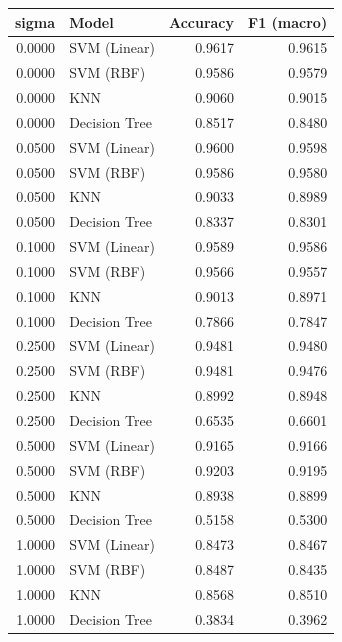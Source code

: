 \begin{tabular}{rlrr}
\toprule
sigma & Model & Accuracy & F1 (macro) \\
\midrule
0.0000 & SVM (Linear) & 0.9617 & 0.9615 \\
0.0000 & SVM (RBF) & 0.9586 & 0.9579 \\
0.0000 & KNN & 0.9060 & 0.9015 \\
0.0000 & Decision Tree & 0.8517 & 0.8480 \\
0.0500 & SVM (Linear) & 0.9600 & 0.9598 \\
0.0500 & SVM (RBF) & 0.9586 & 0.9580 \\
0.0500 & KNN & 0.9033 & 0.8989 \\
0.0500 & Decision Tree & 0.8337 & 0.8301 \\
0.1000 & SVM (Linear) & 0.9589 & 0.9586 \\
0.1000 & SVM (RBF) & 0.9566 & 0.9557 \\
0.1000 & KNN & 0.9013 & 0.8971 \\
0.1000 & Decision Tree & 0.7866 & 0.7847 \\
0.2500 & SVM (Linear) & 0.9481 & 0.9480 \\
0.2500 & SVM (RBF) & 0.9481 & 0.9476 \\
0.2500 & KNN & 0.8992 & 0.8948 \\
0.2500 & Decision Tree & 0.6535 & 0.6601 \\
0.5000 & SVM (Linear) & 0.9165 & 0.9166 \\
0.5000 & SVM (RBF) & 0.9203 & 0.9195 \\
0.5000 & KNN & 0.8938 & 0.8899 \\
0.5000 & Decision Tree & 0.5158 & 0.5300 \\
1.0000 & SVM (Linear) & 0.8473 & 0.8467 \\
1.0000 & SVM (RBF) & 0.8487 & 0.8435 \\
1.0000 & KNN & 0.8568 & 0.8510 \\
1.0000 & Decision Tree & 0.3834 & 0.3962 \\
\bottomrule
\end{tabular}
